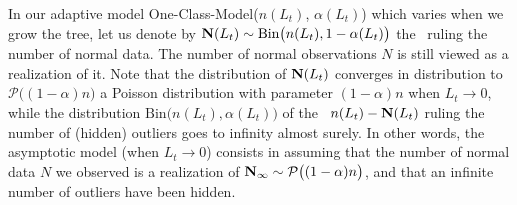 \begin{remark}
In our adaptive model One-Class-Model($n(L_t)$, $\alpha(L_t)$) which varies when we grow the tree, let us denote by $\mathbf N(L_t) \sim \text{Bin}\big(n(L_t), 1-\alpha(L_t)\big)$ the \rv~ruling the number of normal data. The number of normal observations $N$ is still viewed as a realization of it. Note that the distribution of $\mathbf N(L_t)$ converges in distribution to $\mathcal{P}\big((1-\alpha)n\big)$ a Poisson distribution with parameter $(1-\alpha) n$ when $L_t \to 0$, while the distribution $\text{Bin}\big(n(L_t), \alpha(L_t)\big)$ of the \rv~$n(L_t) - \mathbf N(L_t)$ ruling the number of (hidden) outliers goes to infinity almost surely. In other words, the asymptotic model (when $L_t \to 0$) consists in assuming that the number of normal data $N$ we observed is a realization of $\mathbf N_\infty \sim \mathcal{P}\big((1-\alpha)n\big)$, and that an infinite number of outliers have been hidden.
\end{remark}


